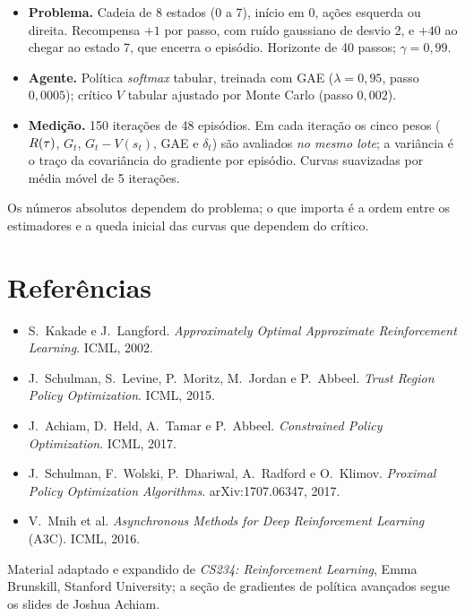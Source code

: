 \documentclass[11pt, a4paper]{article}
\begin{document}
\begin{itemize}[itemsep=0.15em]
  \item \textbf{Problema.} Cadeia de 8 estados (0 a 7), início em 0, ações
        esquerda ou direita. Recompensa $+1$ por passo, com ruído gaussiano de
        desvio 2, e $+40$ ao chegar ao estado 7, que encerra o episódio.
        Horizonte de 40 passos; $\gamma = 0{,}99$.
  \item \textbf{Agente.} Política \emph{softmax} tabular, treinada com GAE
        ($\lambda = 0{,}95$, passo $0{,}0005$); crítico $V$ tabular ajustado
        por Monte Carlo (passo $0{,}002$).
  \item \textbf{Medição.} 150 iterações de 48 episódios. Em cada iteração os
        cinco pesos ($R(\tau)$, $G_t$, $G_t - V(s_t)$, GAE e $\delta_t$) são
        avaliados \emph{no mesmo lote}; a variância é o traço da covariância do
        gradiente por episódio. Curvas suavizadas por média móvel de 5 iterações.
\end{itemize}

Os números absolutos dependem do problema; o que importa é a ordem entre os
estimadores e a queda inicial das curvas que dependem do crítico.

\section*{Referências}
\begin{itemize}[itemsep=0.15em]
  \item S.~Kakade e J.~Langford. \emph{Approximately Optimal Approximate
        Reinforcement Learning}. ICML, 2002.
  \item J.~Schulman, S.~Levine, P.~Moritz, M.~Jordan e P.~Abbeel.
        \emph{Trust Region Policy Optimization}. ICML, 2015.
  \item J.~Achiam, D.~Held, A.~Tamar e P.~Abbeel. \emph{Constrained Policy
        Optimization}. ICML, 2017.
  \item J.~Schulman, F.~Wolski, P.~Dhariwal, A.~Radford e O.~Klimov.
        \emph{Proximal Policy Optimization Algorithms}. arXiv:1707.06347, 2017.
  \item V.~Mnih et al. \emph{Asynchronous Methods for Deep Reinforcement
        Learning} (A3C). ICML, 2016.
\end{itemize}

\vspace{0.6em}
{\footnotesize\color{rlCinza}Material adaptado e expandido de \emph{CS234:
Reinforcement Learning}, Emma Brunskill, Stanford University; a seção de
gradientes de política avançados segue os slides de Joshua Achiam.}
\end{document}
